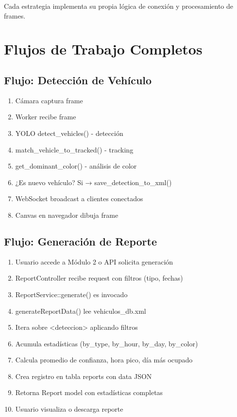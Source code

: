 Cada estrategia implementa su propia lógica de conexión y procesamiento de frames.

\newpage

\section{Flujos de Trabajo Completos}

\subsection{Flujo: Detección de Vehículo}

\begin{enumerate}
    \item Cámara captura frame
    \item Worker recibe frame
    \item YOLO detect\_vehicles() - detección
    \item match\_vehicle\_to\_tracked() - tracking
    \item get\_dominant\_color() - análisis de color
    \item ¿Es nuevo vehículo? Si → save\_detection\_to\_xml()
    \item WebSocket broadcast a clientes conectados
    \item Canvas en navegador dibuja frame
\end{enumerate}

\subsection{Flujo: Generación de Reporte}

\begin{enumerate}
    \item Usuario accede a Módulo 2 o API solicita generación
    \item ReportController recibe request con filtros (tipo, fechas)
    \item ReportService::generate() es invocado
    \item generateReportData() lee vehiculos\_db.xml
    \item Itera sobre \textless{}deteccion\textgreater{} aplicando filtros
    \item Acumula estadísticas (by\_type, by\_hour, by\_day, by\_color)
    \item Calcula promedio de confianza, hora pico, día más ocupado
    \item Crea registro en tabla reports con data JSON
    \item Retorna Report model con estadísticas completas
    \item Usuario visualiza o descarga reporte
\end{enumerate}

